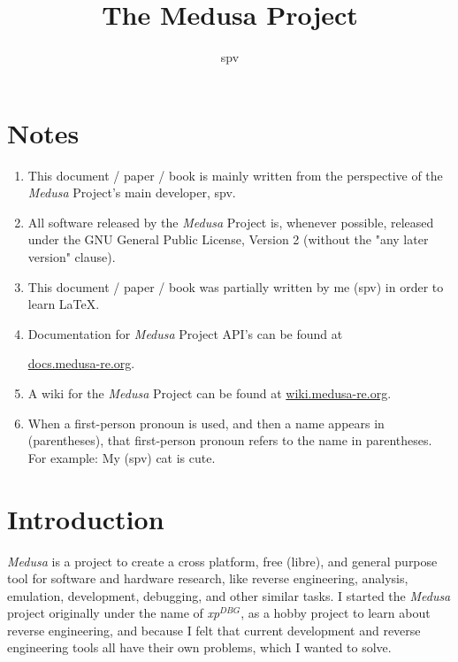 \documentclass{report}
\title{The Medusa Project}
\author{spv}
\newcommand{\xpDBG}{\textit{xp$^{DBG}$}\xspace}
\begin{document}
	\maketitle

	\chapter{Notes}
	\begin{enumerate}
		\item This document / paper / book is mainly written from the
		perspective of the \textit{Medusa} Project's main developer, spv.

		\item All software released by the \textit{Medusa} Project is, whenever
		possible, released under the GNU General Public License, Version 2
		(without the "any later version" clause).

		\item This document / paper / book was partially written by me (spv) in
		order to learn \LaTeX.

		\item Documentation for \textit{Medusa} Project API's can be found at
		
		\href{https://docs.medusa-re.org}{docs.medusa-re.org}.

		\item A wiki for the \textit{Medusa} Project can be found at
		\href{https://wiki.medusa-re.org}{wiki.medusa-re.org}.

		\item When a first-person pronoun is used, and then a name appears in
		(parentheses), that first-person pronoun refers to the name in
		parentheses. For example: My (spv) cat is cute.
	\end{enumerate}

	\chapter{Introduction}
	\textit{Medusa} is a project to create a cross platform, free (libre), and
	general purpose tool for software and hardware research, like reverse
	engineering, analysis, emulation, development, debugging, and other similar
	tasks. I started the \textit{Medusa} project originally under the name of
	\xpDBG, as a hobby project to learn about reverse engineering, and because I
	felt that current development and reverse engineering tools all have their
	own problems, which I wanted to solve.
\end{document}
